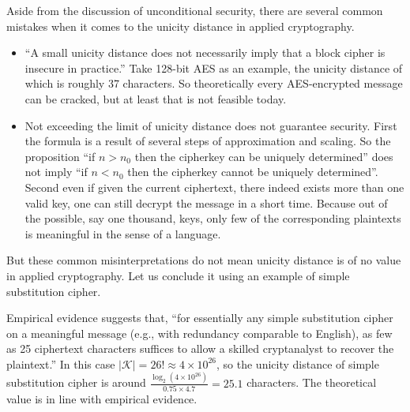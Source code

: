 \documentclass[letterpaper, 10 pt, conference]{ieeeconf}  %
\theoremstyle{definition}
\theoremstyle{property}
\begin{document}
Aside from the discussion of unconditional security, there are several common mistakes when it comes to the unicity distance in applied cryptography.
\begin{itemize}
    \item ``A small unicity distance does not necessarily imply that a block cipher is insecure in practice.''\cite{katz1996handbook} Take 128-bit AES as an example, the unicity distance of which is roughly 37 characters. So theoretically every AES-encrypted message can be cracked, but at least that is not feasible today.
    \item Not exceeding the limit of unicity distance does not guarantee security. First the formula is a result of several steps of approximation and scaling. So the proposition ``if $n> n_0$ then the cipherkey can be uniquely determined'' does not imply ``if $n<n_0$ then the cipherkey cannot be uniquely determined''. Second even if given the current ciphertext, there indeed exists more than one valid key, one can still decrypt the message in a short time. Because out of the possible, say one thousand, keys, only few of the corresponding plaintexts is meaningful in the sense of a language.
\end{itemize}

But these common misinterpretations do not mean unicity distance is of no value in applied cryptography. Let us conclude it using an example of simple substitution cipher.

Empirical evidence suggests that, ``for essentially any simple substitution cipher on a meaningful message (e.g., with redundancy comparable to English), as few as 25 ciphertext characters suffices to allow a skilled cryptanalyst to recover the plaintext.''\cite{katz1996handbook} In this case $|\mathcal{K}|=26!\approx 4\times 10^{26}$, so the unicity distance of simple substitution cipher is around $\frac{\log_2(4\times 10^{26})}{0.75\times 4.7}=25.1$ characters. The theoretical value is in line with empirical evidence.

\addtolength{\textheight}{-12cm}   %


\nocite{*}



\end{document}
